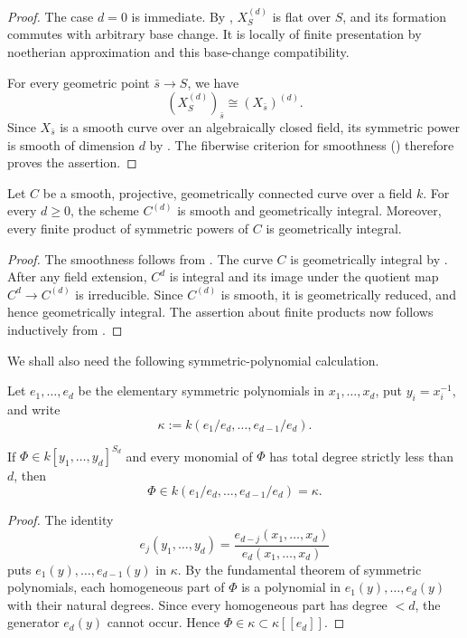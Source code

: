 \begin{proof}
The case $d=0$ is immediate. By
, $X_S^{(d)}$ is flat over $S$,
and its formation commutes with arbitrary base change. It is locally of
finite presentation by noetherian approximation and this base-change
compatibility.

For every geometric point $\bar s\to S$, we have
\[
(X_S^{(d)})_{\bar s}\cong(X_{\bar s})^{(d)}.
\]
Since $X_{\bar s}$ is a smooth curve over an algebraically closed field,
its symmetric power is smooth of dimension $d$ by
\cite[Chapter~III, Proposition~3.2]{milneAV}.
The fiberwise criterion for smoothness () therefore proves
the assertion.
\end{proof}

\begin{cor}\label{cor:symmetric_power_curve_geometry}
Let $C$ be a smooth, projective, geometrically connected curve over a field
$k$. For every $d\geq 0$, the scheme $C^{(d)}$ is smooth and geometrically
integral. Moreover, every finite product of symmetric powers of $C$ is
geometrically integral.
\end{cor}

\begin{proof}
The smoothness follows from .
The curve $C$ is geometrically integral by . After any field
extension, $C^d$ is integral and its image under the quotient map
$C^d\to C^{(d)}$ is irreducible. Since $C^{(d)}$ is smooth, it is geometrically
reduced, and hence geometrically integral. The assertion about finite products
now follows inductively from .
\end{proof}

We shall also need the following symmetric-polynomial calculation.

Let $e_1,\dots,e_d$ be the elementary symmetric polynomials in
$x_1,\dots,x_d$, put $y_i=x_i^{-1}$, and write
\[
    \kappa:=k(e_1/e_d,\dots,e_{d-1}/e_d).
\]

\begin{lemma}
\label{lemma:symmetric_regularity}
If $\Phi\in k[y_1,\dots,y_d]^{S_d}$ and every monomial of $\Phi$ has total
degree strictly less than $d$, then
\[
    \Phi\in k(e_1/e_d,\dots,e_{d-1}/e_d)=\kappa.
\]
\end{lemma}

\begin{proof}
The identity
\[
    e_j(y_1,\dots,y_d)
       =\frac{e_{d-j}(x_1,\dots,x_d)}{e_d(x_1,\dots,x_d)}
\]
puts $e_1(y),\dots,e_{d-1}(y)$ in $\kappa$. By the fundamental theorem of
symmetric polynomials, each homogeneous part of $\Phi$ is a polynomial in
$e_1(y),\dots,e_d(y)$ with their natural degrees. Since every homogeneous
part has degree $<d$, the generator $e_d(y)$ cannot occur. Hence
$\Phi\in\kappa\subset\kappa[[e_d]]$.
\end{proof}


